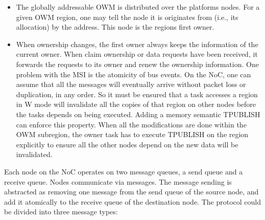 \documentclass[a4paper]{article}
\begin{document}
\begin{itemize}
\item {
The globally addressable OWM is distributed over the
platform{\textquotesingle}s nodes. For a given OWM region, one may tell
the node it is originates from (i.e., its allocation) by the address.
This node is the region{\textquotesingle}s first owner.}
\item {
When ownership changes, the first owner always keeps the information of
the current owner. When claim ownership or data requests have been
received, it forwards the requests to its owner and renew the ownership
information. One problem with the MSI is the atomicity of bus events.
On the NoC, one can assume that all the messages will eventually arrive
without packet loss or duplication, in any order. So it must be ensured
that a task accesses a region in W mode will invalidate all the copies
of that region on other nodes before the tasks depends on being
executed. Adding a memory semantic TPUBLISH can enforce this property.
When all the modifications are done within the OWM subregion, the owner
task has to execute TPUBLISH on the region explicitly to ensure all the
other nodes depend on the new data will be invalidated.}
\end{itemize}
{
Each node on the NoC operates on two message queues, a send queue and a
receive queue. Nodes communicate via messages. The message sending is
abstracted as removing one message from the send queue of the source
node, and add it atomically to the receive queue of the destination
node. The protocol could be divided into three message types: }
\end{document}
